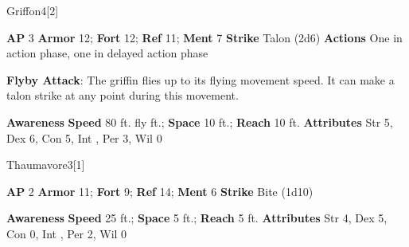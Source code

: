 \begin{monsection}{Griffon}{4}[2]
\vspace{-1em}\vspace{-1em}
\begin{spellcontent}
\begin{spelltargetinginfo}
{\textbf{AP} 3}
\pari \textbf{Armor} 12;
\textbf{Fort} 12;
\textbf{Ref} 11;
\textbf{Ment} 7
\pari \textbf{Strike} Talon  (2d6)
\pari \textbf{Actions} One in action phase, one in delayed action phase
\end{spelltargetinginfo}
\begin{spelleffects}
\pari
\textbf{Flyby Attack}:
The griffin flies up to its flying movement speed.
It can make a talon strike at any point during this movement.
\end{spelleffects}
\end{spellcontent}
\begin{spellsubcontent}
\begin{spellfooter}
\pari \textbf{Awareness} 
\pari \textbf{Speed} 80 ft. fly ft.;
\textbf{Space} 10 ft.;
\textbf{Reach} 10 ft.
\pari \textbf{Attributes}
Str 5,
Dex 6,
Con 5,
Int ,
Per 3,
Wil 0
\end{spellfooter}
\end{spellsubcontent}
\end{monsection}
\begin{monsection}{Thaumavore}{3}[1]
\vspace{-1em}\vspace{-1em}
\begin{spellcontent}
\begin{spelltargetinginfo}
{\textbf{AP} 2}
\pari \textbf{Armor} 11;
\textbf{Fort} 9;
\textbf{Ref} 14;
\textbf{Ment} 6
\pari \textbf{Strike} Bite  (1d10)
\end{spelltargetinginfo}
\end{spellcontent}
\begin{spellsubcontent}
\begin{spellfooter}
\pari \textbf{Awareness} 
\pari \textbf{Speed} 25 ft.;
\textbf{Space} 5 ft.;
\textbf{Reach} 5 ft.
\pari \textbf{Attributes}
Str 4,
Dex 5,
Con 0,
Int ,
Per 2,
Wil 0
\end{spellfooter}
\end{spellsubcontent}
\end{monsection}
